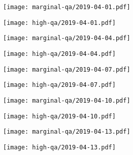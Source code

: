 \documentclass{article}
\begin{document}
\begin{figure}[H]
	\ContinuedFloat
	\centering
	\begin{subfigure}{0.48\linewidth}
		\texttt{[image: marginal-qa/2019-04-01.pdf]}
	\end{subfigure}
	\begin{subfigure}{0.48\linewidth}
		\texttt{[image: high-qa/2019-04-01.pdf]}
	\end{subfigure}
	\begin{subfigure}{0.48\linewidth}
		\texttt{[image: marginal-qa/2019-04-04.pdf]}
	\end{subfigure}
	\begin{subfigure}{0.48\linewidth}
		\texttt{[image: high-qa/2019-04-04.pdf]}
	\end{subfigure}
	\begin{subfigure}{0.48\linewidth}
		\texttt{[image: marginal-qa/2019-04-07.pdf]}
	\end{subfigure}
	\begin{subfigure}{0.48\linewidth}
		\texttt{[image: high-qa/2019-04-07.pdf]}
	\end{subfigure}
	\begin{subfigure}{0.48\linewidth}
		\texttt{[image: marginal-qa/2019-04-10.pdf]}
	\end{subfigure}
	\begin{subfigure}{0.48\linewidth}
		\texttt{[image: high-qa/2019-04-10.pdf]}
	\end{subfigure}
	\begin{subfigure}{0.48\linewidth}
		\texttt{[image: marginal-qa/2019-04-13.pdf]}
	\end{subfigure}
	\begin{subfigure}{0.48\linewidth}
		\texttt{[image: high-qa/2019-04-13.pdf]}
	\end{subfigure}
\end{figure}
\end{document}

